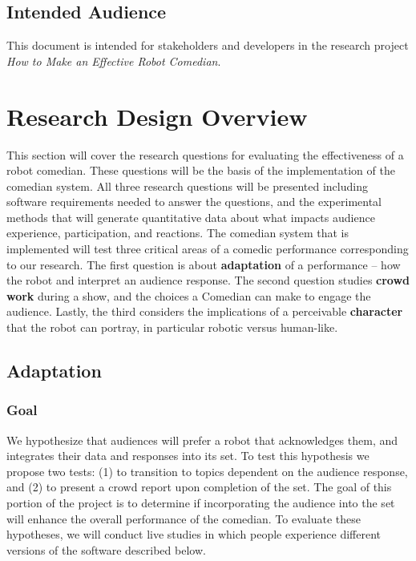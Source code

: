\documentclass[onecolumn, draftclsnofoot,10pt, compsoc]{IEEEtran}
\begin{document}
\subsection{Intended Audience}
	This document is intended for stakeholders and developers in the research project \textit{How to Make an Effective Robot Comedian}.


\section{Research Design Overview}
This section will cover the research questions for evaluating the effectiveness of a robot comedian. These questions will
be the basis of the implementation of the comedian system. All three research questions will be presented including
software requirements needed to answer the questions, and the experimental methods that will generate quantitative
data about what impacts audience experience, participation, and reactions.
The comedian system that is implemented will test three critical areas of a comedic performance corresponding
to our research. The first question is about \textbf{adaptation} of a performance – how the robot and interpret an audience
response. The second question studies \textbf{crowd work} during a show, and the choices a Comedian can make to engage the
audience. Lastly, the third considers the implications of a perceivable \textbf{character} that the robot can portray, in particular robotic versus human-like.


\subsection{Adaptation}
\subsubsection{Goal}
We hypothesize that audiences will prefer a robot that acknowledges them, and integrates their data and responses into
its set. To test this hypothesis we propose two tests: (1) to transition to topics dependent on the audience response,
and (2) to present a crowd report upon completion of the set. The goal of this portion of the project is to determine
if incorporating the audience into the set will enhance the overall performance of the comedian. To evaluate these
hypotheses, we will conduct live studies in which people experience different versions of the software described below.
\end{document}
